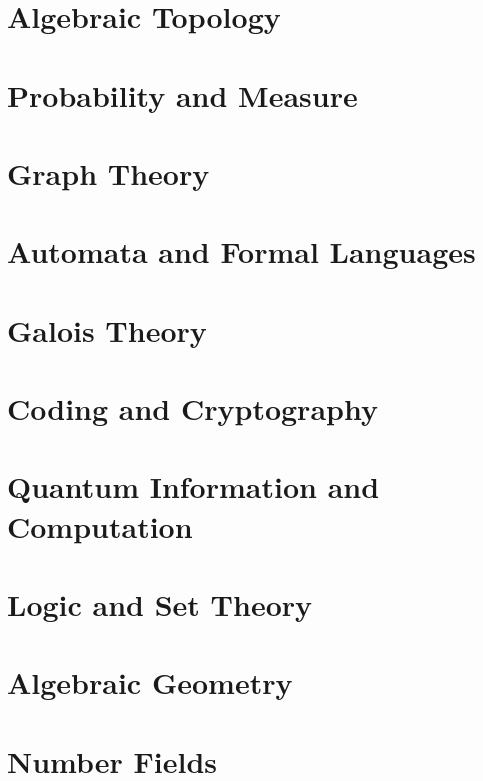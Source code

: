 \newcommand{\yearnumber}{II}


\chapter{Algebraic Topology}

\chapter{Probability and Measure}

\chapter{Graph Theory}

\chapter{Automata and Formal Languages}

\chapter{Galois Theory}

\chapter{Coding and Cryptography}

\chapter{Quantum Information and Computation}

\chapter{Logic and Set Theory}

\chapter{Algebraic Geometry}

\chapter{Number Fields}



